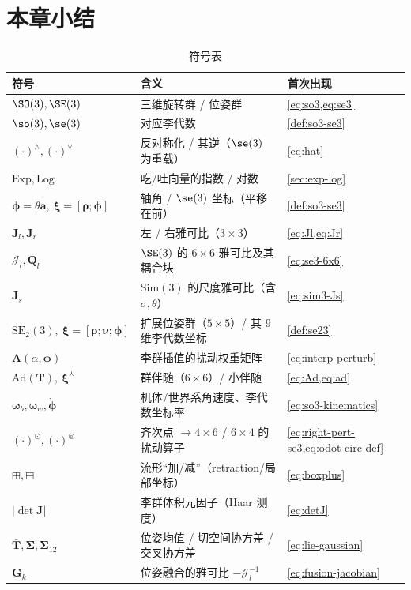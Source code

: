 \section*{本章小结}

\begin{table}[H]\centering\small
\caption{符号表}
\begin{tabular}{lll}
\toprule
符号 & 含义 & 首次出现 \\
\midrule
$\SO(3),\SE(3)$ & 三维旋转群 / 位姿群 & \cref{eq:so3,eq:se3} \\
$\so(3),\se(3)$ & 对应李代数 & \cref{def:so3-se3} \\
$(\cdot)^\wedge,(\cdot)^\vee$ & 反对称化 / 其逆（$\se(3)$ 为重载） & \cref{eq:hat} \\
$\mathrm{Exp},\mathrm{Log}$ & 吃/吐向量的指数 / 对数 & \cref{sec:exp-log} \\
$\boldsymbol{\phi}=\theta\mathbf{a},\ \boldsymbol{\xi}=[\boldsymbol{\rho};\boldsymbol{\phi}]$ & 轴角 / $\se(3)$ 坐标（平移在前） & \cref{def:so3-se3} \\
$\mathbf{J}_l,\mathbf{J}_r$ & 左 / 右雅可比（$3\times3$） & \cref{eq:Jl,eq:Jr} \\
$\boldsymbol{\mathcal{J}}_l,\mathbf{Q}_l$ & $\SE(3)$ 的 $6\times6$ 雅可比及其耦合块 & \cref{eq:se3-6x6} \\
$\mathbf{J}_s$ & $\mathrm{Sim}(3)$ 的尺度雅可比（含 $\sigma,\theta$） & \cref{eq:sim3-Js} \\
$\mathrm{SE}_2(3),\ \boldsymbol{\xi}=[\boldsymbol{\rho};\boldsymbol{\nu};\boldsymbol{\phi}]$ & 扩展位姿群（$5\times5$）/ 其 $9$ 维李代数坐标 & \cref{def:se23} \\
$\mathbf{A}(\alpha,\boldsymbol{\phi})$ & 李群插值的扰动权重矩阵 & \cref{eq:interp-perturb} \\
$\mathrm{Ad}(\mathbf{T}),\ \boldsymbol{\xi}^\curlywedge$ & 群伴随（$6\times6$）/ 小伴随 & \cref{eq:Ad,eq:ad} \\
$\boldsymbol{\omega}_b,\boldsymbol{\omega}_w,\dot{\boldsymbol{\phi}}$ & 机体/世界系角速度、李代数坐标率 & \cref{eq:so3-kinematics} \\
$(\cdot)^\odot,(\cdot)^\circledcirc$ & 齐次点 $\to 4\times6$ / $6\times4$ 的扰动算子 & \cref{eq:right-pert-se3,eq:odot-circ-def} \\
$\boxplus,\boxminus$ & 流形“加/减”（retraction/局部坐标） & \cref{eq:boxplus} \\
$|\det\mathbf{J}|$ & 李群体积元因子（Haar 测度） & \cref{eq:detJ} \\
$\bar{\mathbf{T}},\boldsymbol{\Sigma},\boldsymbol{\Sigma}_{12}$ & 位姿均值 / 切空间协方差 / 交叉协方差 & \cref{eq:lie-gaussian} \\
$\mathbf{G}_k$ & 位姿融合的雅可比 $-\boldsymbol{\mathcal{J}}_l^{-1}$ & \cref{eq:fusion-jacobian} \\
\bottomrule
\end{tabular}
\end{table}

